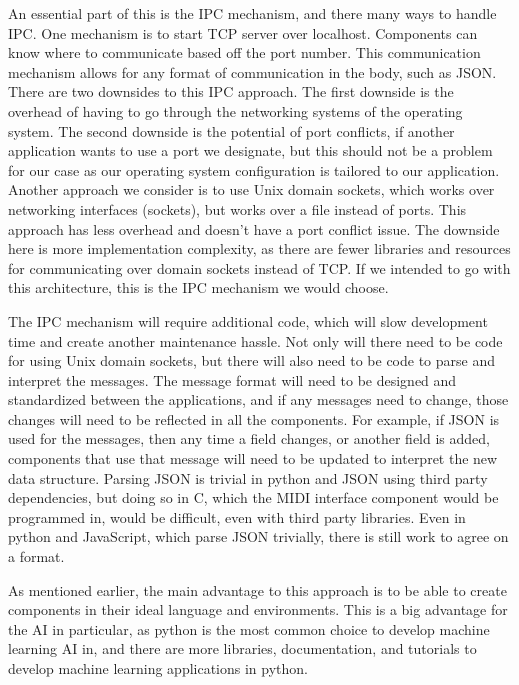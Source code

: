 An essential part of this is the IPC mechanism, and there many ways to handle IPC. One
mechanism is to start TCP server over localhost. Components can know where to communicate
based off the port number. This communication mechanism allows for any format of
communication in the body, such as JSON. There are two downsides to this IPC approach. The
first downside is the overhead of having to go through the networking systems of the
operating system. The second downside is the potential of port conflicts, if another
application wants to use a port we designate, but this should not be a problem for our
case as our operating system configuration is tailored to our application. Another
approach we consider is to use Unix domain sockets, which works over networking interfaces
(sockets), but works over a file instead of ports. This approach has less overhead and
doesn't have a port conflict issue. The downside here is more implementation complexity,
as there are fewer libraries and resources for communicating over domain sockets instead of
TCP. If we intended to go with this architecture, this is the IPC mechanism we would
choose.

The IPC mechanism will require additional code, which will slow development time and
create another maintenance hassle. Not only will there need to be code for using Unix
domain sockets, but there will also need to be code to parse and interpret the messages.
The message format will need to be designed and standardized between the applications, and
if any messages need to change, those changes will need to be reflected in all the
components. For example, if JSON is used for the messages, then any time a field changes,
or another field is added, components that use that message will need to be updated to
interpret the new data structure. Parsing JSON is trivial in python and JSON using third
party dependencies, but doing so in C, which the MIDI interface component would be
programmed in, would be difficult, even with third party libraries. Even in python and
JavaScript, which parse JSON trivially, there is still work to agree on a format.

As mentioned earlier, the main advantage to this approach is to be able to create
components in their ideal language and environments. This is a big advantage for the AI in
particular, as python is the most common choice to develop machine learning AI in, and
there are more libraries, documentation, and tutorials to develop machine learning
applications in python.

